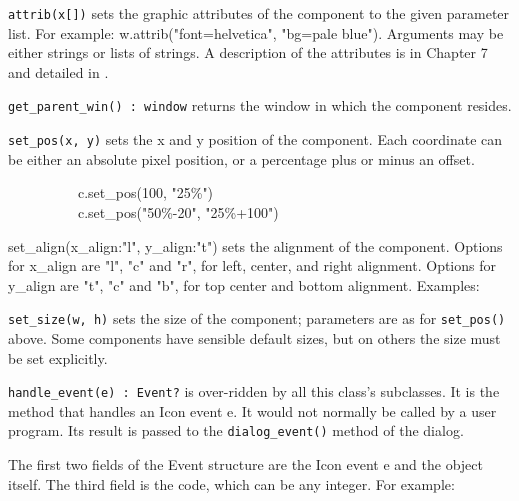 \texttt{attrib(x[])} sets the graphic attributes of the component to the given
parameter list. For example:
w.attrib("font=helvetica",
"bg=pale blue"). Arguments may be either
strings or lists of strings. A description of the attributes is in
Chapter 7 and detailed in \cite{GJT98}.

\texttt{get\_parent\_win() : window} returns the window in which
the component resides.

\texttt{set\_pos(x, y)} sets the x and y position of the component. Each
coordinate can be either an absolute pixel position, or a
percentage plus or minus an offset.

{\ttfamily
\ \ \ \ \ \ \ \ \ \ c.set\_pos(100, "25\%") \\
\ \ \ \ \ \ \ \ \ \ c.set\_pos("50\%-20", "25\%+100")}

{\ttfamily set\_align(x\_align:"l",
y\_align:"t")} sets the alignment of the
component. Options for x\_align are "l", "c" and "r",
for left, center, and right alignment. Options for y\_align are
"t", "c" and "b", for top center and bottom alignment.
Examples:


\texttt{set\_size(w, h)} sets the size of the component; parameters are as
for \texttt{set\_pos()} above. Some components have sensible default sizes,
but on others the size must be set explicitly.

\texttt{handle\_event(e) : Event?} is over-ridden by all this
class's subclasses. It is the method that handles an
Icon event e. It would not normally be called by a user program. Its
result is passed to the \texttt{dialog\_event()} method of the dialog.

The first two fields of the Event structure are the Icon event e and the
object itself. The third field is the code, which can be any integer.
For example:


